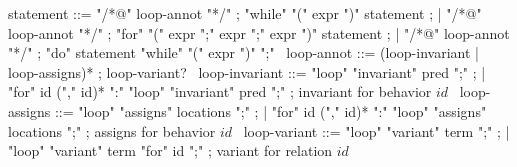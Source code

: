 \begin{syntax}
  statement ::= "/*@" loop-annot "*/" ;
  "while" "(" expr ")" statement ;
  | "/*@" loop-annot "*/" ;
  "for" "(" expr ";" expr ";" expr ")" statement ;
  | "/*@" loop-annot "*/" ;
  "do" statement "while" "(" expr ")" ";" 
  \
  loop-annot ::= (loop-invariant | loop-assigns)* ;
  loop-variant?
  \
  loop-invariant ::= "loop" "invariant" pred ";" ;
  | {"for" id ("," id)* ":" "loop" "invariant" pred ";"} ; invariant for behavior $id$
  \
  loop-assigns ::= "loop" "assigns" locations ";" ;
  | {"for" id ("," id)* ":" "loop" "assigns" locations ";"} ; assigns for behavior $id$
  \
  loop-variant ::= "loop" "variant" term ";" ;
  | "loop" "variant" term "for" id ";" ; variant for relation $id$
\end{syntax}
